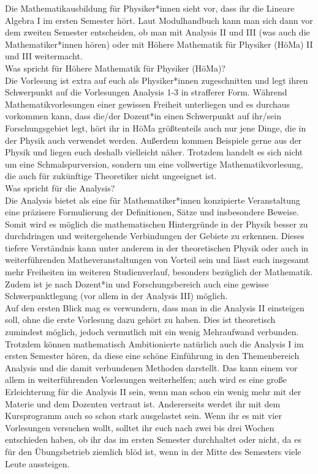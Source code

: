 \label{mathephysik}

Die Mathematikausbildung für Physiker*innen sieht vor, dass ihr die Lineare Algebra I im ersten Semester hört. Laut Modulhandbuch kann man sich dann vor dem zweiten Semester entscheiden, ob man mit Analysis II und III (was auch die Mathematiker*innen hören) oder mit Höhere Mathematik für Physiker (HöMa) II und III weitermacht.\\

Was spricht für Höhere Mathematik für Physiker (HöMa)?\\
Die Vorlesung ist extra auf euch als Physiker*innen zugeschnitten und legt ihren Schwerpunkt auf die Vorlesungen Analysis 1-3 in strafferer Form. Während Mathematikvorlesungen einer gewissen
Freiheit unterliegen und es durchaus vorkommen kann, dass die/der Dozent*in einen Schwerpunkt auf ihr/sein Forschungsgebiet legt, hört ihr in HöMa größtenteils auch nur jene Dinge, die in der Physik auch verwendet werden. Außerdem kommen Beispiele gerne aus der Physik und liegen euch deshalb vielleicht näher. Trotzdem handelt es sich nicht um eine Schmalspurversion, sondern um eine vollwertige Mathematikvorlesung, die auch für zukünftige Theoretiker nicht ungeeignet ist.\\

Was spricht für die Analysis?\\
Die Analysis bietet als eine für Mathematiker*innen konzipierte Veranstaltung eine präzisere Formulierung der Definitionen, Sätze und insbesondere Beweise. Somit wird es möglich die mathematischen Hintergründe in der Physik besser zu durchdringen und weitergehende Verbindungen der Gebiete zu erkennen. Dieses tiefere Verständnis kann unter anderem in der theoretischen Physik oder auch in weiterführenden Matheveranstaltungen von Vorteil sein und lässt euch insgesamt mehr Freiheiten im weiteren Studienverlauf, besonders bezüglich der Mathematik.
Zudem ist je nach Dozent*in und Forschungsbereich auch eine gewisse Schwerpunktlegung (vor allem in der Analysis III) möglich.\\

Auf den ersten Blick mag es verwundern, dass man in die Analysis II einsteigen soll, ohne die erste Vorlesung dazu gehört zu haben. Dies ist theoretisch zumindest möglich, jedoch vermutlich mit ein wenig Mehraufwand verbunden. Trotzdem können mathematisch Ambitionierte natürlich auch die Analysis I im ersten Semester hören, da diese eine schöne Einführung in den Themenbereich Analysis und die damit verbundenen Methoden darstellt. Das kann einem vor allem in weiterführenden Vorlesungen weiterhelfen; auch wird es eine große Erleichterung für die Analysis II sein, wenn man schon ein wenig mehr mit der Materie und dem Dozenten vertraut ist.
Andererseits werdet ihr mit dem Kursprogramm auch so schon stark ausgelastet sein. Wenn ihr es mit vier Vorlesungen versuchen wollt, solltet ihr euch nach zwei bis drei Wochen entschieden haben, ob ihr das im ersten Semester durchhaltet oder nicht, da es für den Übungsbetrieb ziemlich blöd ist, wenn in der Mitte des Semesters viele Leute aussteigen.
